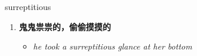 
\begin{frame}
{\huge surreptitious}
\begin{center}
\begin{enumerate}\Large
  \item \textbf{鬼鬼祟祟的，偷偷摸摸的}
  \begin{itemize}
    \item \em{\Large{he took a surreptitious glance at her bottom}}
  \end{itemize}
\end{enumerate}
\end{center}
\end{frame}
